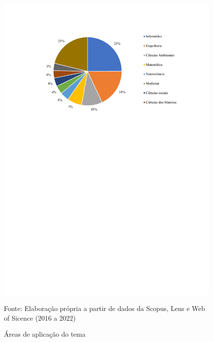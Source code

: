 \begin{figure}[H]
	\centering
	\caption{Áreas de aplicação do tema}
	\label{fig:areas}
	\includegraphics[width=0.9\linewidth]{Revisao/Figuras/areas}
	\vspace{0.2cm}
	
Fonte: Elaboração própria a partir de dados da Scopus, Lens e Web of Sicence (2016 a 2022)
\end{figure}
